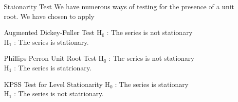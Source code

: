 \documentclass{beamer}
\newcommand{\mathSubTT}[2]{$\text{#1}_{\text{#2}}$}
\begin{document}

	\begin{frame}{Staionarity Test}
		We have numerous ways of testing for the presence of a unit root. 
		We have chosen to apply
		
		\begin{block}{Augmented Dickey-Fuller Test}
			\mathSubTT{H}{0} : The series is not stationary \\
			\mathSubTT{H}{1} : The series is stationary. \vspace{5pt}
		\end{block}
	
		\begin{exampleblock}{Phillips-Perron Unit Root Test}
			\mathSubTT{H}{0} : The series is not stationary \\
			\mathSubTT{H}{1} : The series is statrionary. \vspace{5pt}
		\end{exampleblock}
		
		\begin{alertblock}{KPSS Test for Level Stationarity}
			\mathSubTT{H}{0} : The series is stationary \\
			\mathSubTT{H}{1} : The series is not statrionary. \vspace{5pt}
		\end{alertblock}
	\end{frame}
	
\end{document}
